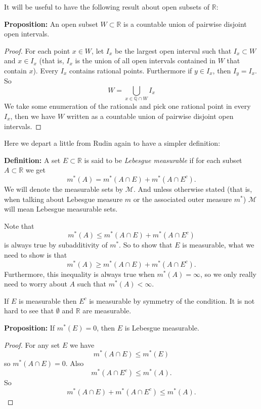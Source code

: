 \documentclass[12pt]{book}
\newcommand{\R}{{\mathbb{R}}}
\newcommand{\Q}{{\mathbb{Q}}}
\newcommand{\sM}{{\mathcal{M}}}
\theoremstyle{plain}
\theoremstyle{remark}
\theoremstyle{definition}
\theoremstyle{exercise}
\theoremstyle{example}
\begin{document}
It will be useful to have the following result about open subsets of $\R$:

\medskip

\textbf{Proposition:}
An open subset $W \subset \R$ is a countable union of pairwise
disjoint open intervals.

\medskip

\begin{proof}
For each point $x \in W$, let $I_x$ be the largest open interval such
that $I_x \subset W$ and $x \in I_x$ (that is, $I_x$ is the union of all
open intervals contained in $W$ that contain $x$).  Every $I_x$ contains
rational points.  Furthermore if $y \in I_x$, then $I_y = I_x$.  So
$$
W = \bigcup_{x \in \Q \cap W} I_x
$$
We take some enumeration of the rationals and pick one rational
point in every $I_x$, then we have $W$ written as a countable union of
pairwise disjoint open intervals.
\end{proof}

\medskip

Here we depart a little from Rudin again to have a simpler definition:

\textbf{Definition:}
A set $E \subset \R$ is said to be \emph{Lebesgue measurable}
if for each subset $A \subset \R$ we get
$$
m^*(A) = m^*(A \cap E) + m^*(A \cap E^c) .
$$
We will denote the measurable sets by $\sM$.  And unless otherwise stated
(that is, when talking about Lebesgue measure $m$ or the associated outer
measure $m^*$) $\sM$ will mean Lebesgue measurable sets.

Note that
$$
m^*(A) \leq m^*(A \cap E) + m^*(A \cap E^c)
$$
is always true by subadditivity of $m^*$.  So to show that $E$ is measurable,
what we need to show is that
$$
m^*(A) \geq m^*(A \cap E) + m^*(A \cap E^c).
$$
Furthermore, this inequality is always true when $m^*(A) = \infty$, so
we only really need to worry about $A$ such that $m^*(A) < \infty$.

If $E$ is measurable then $E^c$ is measurable by symmetry of the
condition.  It is not hard
to see that $\emptyset$ and $\R$ are measurable.

\medskip

\textbf{Proposition:}
If $m^*(E) = 0$, then $E$ is Lebesgue measurable.

\medskip

\begin{proof}
For any set $E$ we have
$$
m^*(A \cap E) \leq m^*(E)
$$
so $m^*(A \cap E) = 0$.  Also
$$
m^*(A \cap E^c) \leq m^*(A) .
$$
So
$$
m^*(A \cap E) + m^*(A \cap E^c) \leq m^*(A) .
$$
\end{proof}
\end{document}
